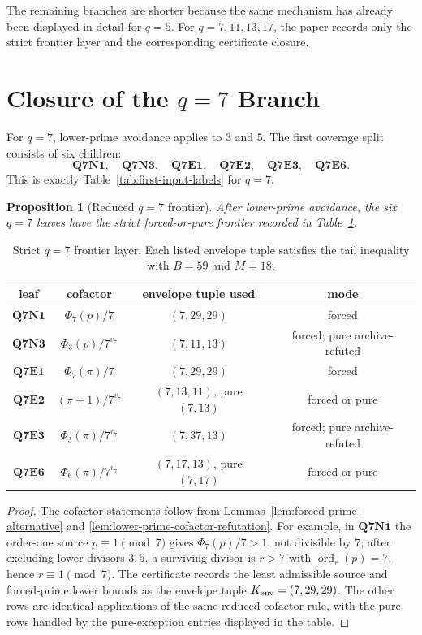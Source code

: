 \documentclass[11pt]{article}
\newtheorem{proposition}[theorem]{Proposition}
\theoremstyle{definition}
\theoremstyle{remark}
\DeclareMathOperator{\ord}{ord}
\begin{document}
\endgroup

The remaining branches are shorter because the same mechanism has already been
displayed in detail for \(q=5\).  For \(q=7,11,13,17\), the paper records only
the strict frontier layer and the corresponding certificate closure.

\section{Closure of the \(q=7\) Branch}
\label{sec:q7}

For \(q=7\), lower-prime avoidance applies to \(3\) and \(5\).  The first
coverage split consists of six children:
\[
  \mathbf{Q7N1},\quad \mathbf{Q7N3},\quad
  \mathbf{Q7E1},\quad \mathbf{Q7E2},\quad
  \mathbf{Q7E3},\quad \mathbf{Q7E6}.
\]
This is exactly Table~\ref{tab:first-input-labels} for \(q=7\).

\begin{proposition}[Reduced \(q=7\) frontier]
\label{prop:q7-frontier}
After lower-prime avoidance, the six \(q=7\) leaves have the strict
forced-or-pure frontier recorded in Table~\ref{tab:q7-frontier}.
\end{proposition}

\begin{table}[ht]
\centering
\small
\begin{tabular}{c|c|c|c}
\toprule
leaf & cofactor & envelope tuple used & mode\\
\midrule
\(\mathbf{Q7N1}\) & \(\Phi_7(p)/7\) & \((7,29,29)\) & forced\\
\(\mathbf{Q7N3}\) & \(\Phi_3(p)/7^{v_7}\) & \((7,11,13)\) & forced; pure archive-refuted\\
\(\mathbf{Q7E1}\) & \(\Phi_7(\pi)/7\) & \((7,29,29)\) & forced\\
\(\mathbf{Q7E2}\) & \((\pi+1)/7^{v_7}\) & \((7,13,11)\), pure \((7,13)\) & forced or pure\\
\(\mathbf{Q7E3}\) & \(\Phi_3(\pi)/7^{v_7}\) & \((7,37,13)\) & forced; pure archive-refuted\\
\(\mathbf{Q7E6}\) & \(\Phi_6(\pi)/7^{v_7}\) & \((7,17,13)\), pure \((7,17)\) & forced or pure\\
\bottomrule
\end{tabular}
\caption{Strict \(q=7\) frontier layer.  Each listed envelope tuple satisfies the
tail inequality with \(B=59\) and \(M=18\).}
\label{tab:q7-frontier}
\end{table}
\FloatBarrier

\begin{proof}
The cofactor statements follow from Lemmas~\ref{lem:forced-prime-alternative}
and \ref{lem:lower-prime-cofactor-refutation}.  For example, in
\(\mathbf{Q7N1}\) the order-one source \(p\equiv1\pmod7\) gives
\(\Phi_7(p)/7>1\), not divisible by \(7\); after excluding lower divisors
\(3,5\), a surviving divisor is \(r>7\) with \(\ord_r(p)=7\), hence
\(r\equiv1\pmod7\).  The certificate records the least admissible source and
forced-prime lower bounds as the envelope tuple \(K_{\rm env}=(7,29,29)\).
The other rows are
identical applications of the same reduced-cofactor rule, with the pure rows
handled by the pure-exception entries displayed in the table.
\end{proof}
\end{document}
